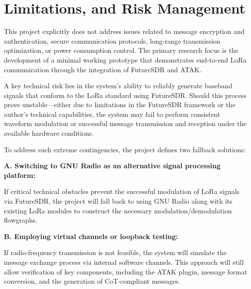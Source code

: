 \section{Limitations, and Risk Management}
This project explicitly does not address issues related to message encryption and authentication, secure communication protocols, long-range transmission optimization, or power consumption control. The primary research focus is the development of a minimal working prototype that demonstrates end-to-end LoRa communication through the integration of FutureSDR and ATAK.

A key technical risk lies in the system's ability to reliably generate baseband signals that conform to the LoRa standard using FutureSDR. Should this process prove unstable—either due to limitations in the FutureSDR framework or the author's technical capabilities, the system may fail to perform consistent waveform modulation or successful message transmission and reception under the available hardware conditions.

To address such extreme contingencies, the project defines two fallback solutions:

\vspace{0.5em}
\noindent\textbf{A. Switching to GNU Radio as an alternative signal processing platform:}\par
 If critical technical obstacles prevent the successful modulation of LoRa signals via FutureSDR, the project will fall back to using GNU Radio along with its existing LoRa modules to construct the necessary modulation/demodulation flowgraphs.

 \vspace{0.5em}
\noindent\textbf{B. Employing virtual channels or loopback testing:}\par
 If radio-frequency transmission is not feasible, the system will simulate the message exchange process via internal software channels. This approach will still allow verification of key components, including the ATAK plugin, message format conversion, and the generation of CoT-compliant messages.